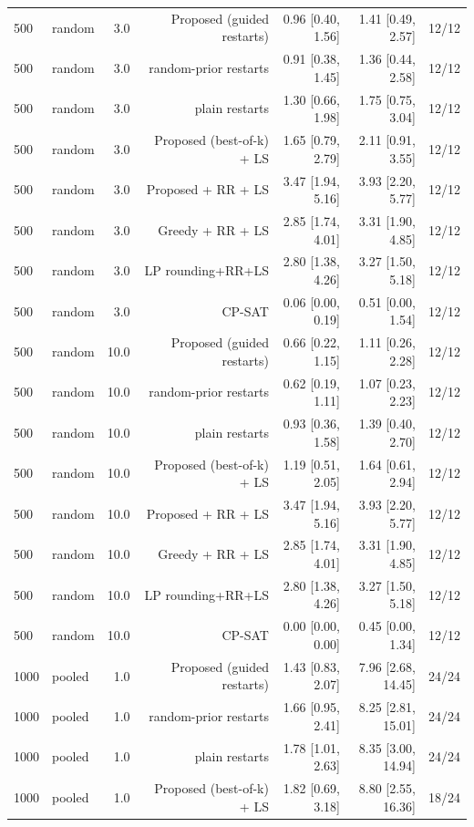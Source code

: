 \begin{table}[t]
\begin{tabular}{llrrrrr}
500 & random & 3.0 & Proposed (guided restarts) & 0.96 [0.40, 1.56] & 1.41 [0.49, 2.57] & 12/12 \\
500 & random & 3.0 & random-prior restarts & 0.91 [0.38, 1.45] & 1.36 [0.44, 2.58] & 12/12 \\
500 & random & 3.0 & plain restarts & 1.30 [0.66, 1.98] & 1.75 [0.75, 3.04] & 12/12 \\
500 & random & 3.0 & Proposed (best-of-k) + LS & 1.65 [0.79, 2.79] & 2.11 [0.91, 3.55] & 12/12 \\
500 & random & 3.0 & Proposed + RR + LS & 3.47 [1.94, 5.16] & 3.93 [2.20, 5.77] & 12/12 \\
500 & random & 3.0 & Greedy + RR + LS & 2.85 [1.74, 4.01] & 3.31 [1.90, 4.85] & 12/12 \\
500 & random & 3.0 & LP rounding+RR+LS & 2.80 [1.38, 4.26] & 3.27 [1.50, 5.18] & 12/12 \\
500 & random & 3.0 & CP-SAT & 0.06 [0.00, 0.19] & 0.51 [0.00, 1.54] & 12/12 \\
500 & random & 10.0 & Proposed (guided restarts) & 0.66 [0.22, 1.15] & 1.11 [0.26, 2.28] & 12/12 \\
500 & random & 10.0 & random-prior restarts & 0.62 [0.19, 1.11] & 1.07 [0.23, 2.23] & 12/12 \\
500 & random & 10.0 & plain restarts & 0.93 [0.36, 1.58] & 1.39 [0.40, 2.70] & 12/12 \\
500 & random & 10.0 & Proposed (best-of-k) + LS & 1.19 [0.51, 2.05] & 1.64 [0.61, 2.94] & 12/12 \\
500 & random & 10.0 & Proposed + RR + LS & 3.47 [1.94, 5.16] & 3.93 [2.20, 5.77] & 12/12 \\
500 & random & 10.0 & Greedy + RR + LS & 2.85 [1.74, 4.01] & 3.31 [1.90, 4.85] & 12/12 \\
500 & random & 10.0 & LP rounding+RR+LS & 2.80 [1.38, 4.26] & 3.27 [1.50, 5.18] & 12/12 \\
500 & random & 10.0 & CP-SAT & 0.00 [0.00, 0.00] & 0.45 [0.00, 1.34] & 12/12 \\
1000 & pooled & 1.0 & Proposed (guided restarts) & 1.43 [0.83, 2.07] & 7.96 [2.68, 14.45] & 24/24 \\
1000 & pooled & 1.0 & random-prior restarts & 1.66 [0.95, 2.41] & 8.25 [2.81, 15.01] & 24/24 \\
1000 & pooled & 1.0 & plain restarts & 1.78 [1.01, 2.63] & 8.35 [3.00, 14.94] & 24/24 \\
1000 & pooled & 1.0 & Proposed (best-of-k) + LS & 1.82 [0.69, 3.18] & 8.80 [2.55, 16.36] & 18/24 \\

\end{tabular}
\end{table}
